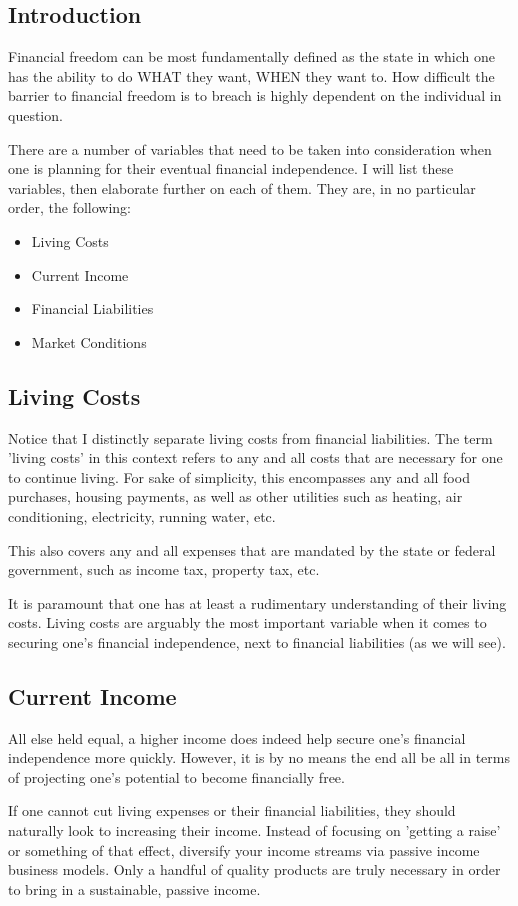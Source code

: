 \documentclass{book}
\numberwithin{equation}{section}
\begin{document}
\subsection{Introduction}
Financial freedom can be most fundamentally defined as the state in which one has the ability to do WHAT they want, WHEN they want to. How difficult the barrier to financial freedom is to breach is highly dependent on the individual in question. 

There are a number of variables that need to be taken into consideration when one is planning for their eventual financial independence. I will list these variables, then elaborate further on each of them. They are, in no particular order, the following:
\begin{itemize}
    \item Living Costs
    \item Current Income
    \item Financial Liabilities
    \item Market Conditions
\end{itemize}
\subsection{Living Costs}
Notice that I distinctly separate living costs from financial liabilities. The term 'living costs' in this context refers to any and all costs that are necessary for one to continue living. For sake of simplicity, this encompasses any and all food purchases, housing payments, as well as other utilities such as heating, air conditioning, electricity, running water, etc. 

This also covers any and all expenses that are mandated by the state or federal government, such as income tax, property tax, etc. 

It is paramount that one has at least a rudimentary understanding of their living costs. Living costs are arguably the most important variable when it comes to securing one's financial independence, next to financial liabilities (as we will see).
\subsection{Current Income}
All else held equal, a higher income does indeed help secure one's financial independence more quickly. However, it is by no means the end all be all in terms of projecting one's potential to become financially free. 

If one cannot cut living expenses or their financial liabilities, they should naturally look to increasing their income. Instead of focusing on 'getting a raise' or something of that effect, diversify your income streams via passive income business models. Only a handful of quality products are truly necessary in order to bring in a sustainable, passive income. 
\end{document}
